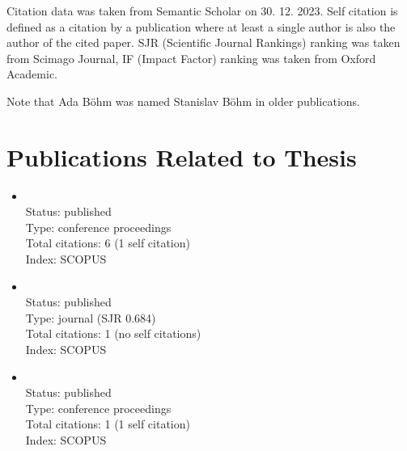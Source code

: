 Citation data was taken from Semantic Scholar on 30. 12. 2023.
Self citation is defined as a citation by a publication where at least a single author is also the
author of the cited paper. SJR (Scientific Journal Rankings) ranking was taken from Scimago Journal,
IF (Impact Factor) ranking was taken from Oxford Academic.

Note that Ada Böhm was named Stanislav Böhm in older publications.

\section*{Publications Related to Thesis}
    \begin{itemize}
		\item{}\vspace{2mm}\\Status: published\\Type: conference proceedings\\Total citations: 6 (1 self citation)\\Index: SCOPUS
		\item{}\vspace{2mm}\\Status: published\\Type: journal (SJR 0.684)\\Total citations: 1 (no self citations)\\Index: SCOPUS
		\item{}\vspace{2mm}\\Status: published\\Type: conference proceedings\\Total citations: 1 (1 self citation)\\Index: SCOPUS
\end{itemize}

\newpage
